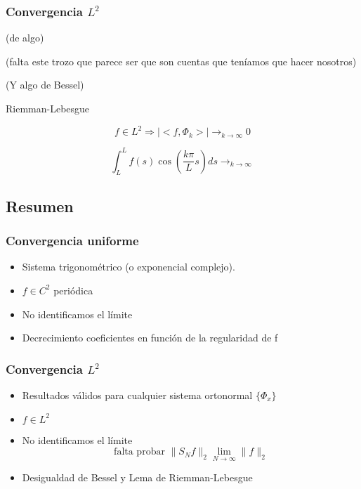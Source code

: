 

		\subsubsection{Convergencia $L^2$} (de algo)

			(falta este trozo que parece ser que son cuentas que teníamos que hacer nosotros)

			(Y algo de Bessel)


			\begin{lemma}{Riemman-Lebesgue}

				\[ f \in L^2 \Rightarrow |<f, \Phi_k>| \rightarrow_{k \to \infty} 0\]

				\[\int^{L}_{L} f(s) \cos \left( \frac{k \pi}{L} s \right) ds \rightarrow_{k \to \infty}  \]

			\end{lemma}

	\subsection{Resumen}


		\subsubsection*{Convergencia uniforme}

			\begin{itemize}
				\item Sistema trigonométrico (o exponencial complejo).
				\item $f \in C^2$ periódica
				\item No identificamos el límite
				\item Decrecimiento coeficientes en función de la regularidad de f
			\end{itemize}

		\subsubsection*{Convergencia $L^2$}

			\begin{itemize}
				\item Resultados válidos para cualquier sistema ortonormal $\{ \Phi_x \}$
				\item $f \in L^2$
				\item No identificamos el límite
				\[\text{falta probar }\|S_N f\|_2 \lim_{N \to \infty} \|f\|_2\]
				\item Desigualdad de Bessel y Lema de Riemman-Lebesgue

			\end{itemize}


